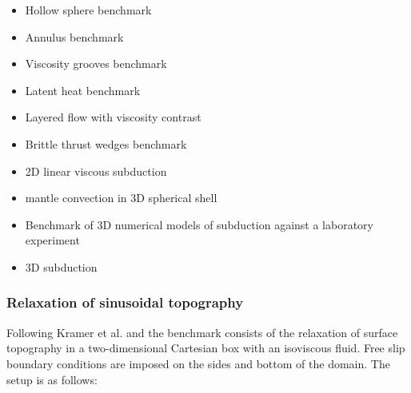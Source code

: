 \begin{itemize}
\item Hollow sphere benchmark \cite{thie17}
\item Annulus benchmark \cite{aspectmanual}
\item Viscosity grooves benchmark \cite{aspectmanual}
\item Latent heat benchmark \cite{aspectmanual}
\item Layered flow with viscosity contrast \cite{aspectmanual} 
\item Brittle thrust wedges benchmark \cite{busa16,aspectmanual}
\item 2D linear viscous subduction \cite{scbe08,gltf18}
\item mantle convection in 3D spherical shell \cite{rasz96,zhzm00,zhmt08,arfw14,liki19}
\item Benchmark of 3D numerical models of subduction against a laboratory experiment \cite{memm18}
\item 3D subduction \cite{ozrs08}
\end{itemize}


\subsubsection{Relaxation of sinusoidal topography}

Following Kramer et al. \cite[Section 3.1.1]{krwd12} and \cite{robh17} 
the benchmark consists of the relaxation of surface topography in a 
two-dimensional Cartesian box with an isoviscous fluid. 
Free slip boundary conditions are imposed on the sides and bottom of the domain.
The setup is as follows:

